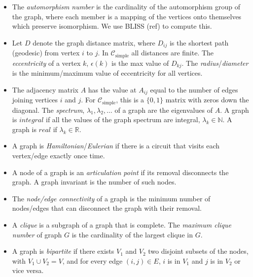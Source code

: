 \documentclass[12pt]{article}
\newcommand{\SIMPLECLASS}{\mathcal{C}_\text{simple}}
\begin{document}
\begin{itemize}
\item The \textit{automorphism number} is the cardinality of the automorphism group of the graph, where each member is a mapping of the vertices onto themselves which preserve isomorphism. We use BLISS (ref) to compute this.

\item Let $D$ denote the graph distance matrix, where $D_{ij}$ is the shortest path (geodesic) from vertex $i$ to $j$. In $\SIMPLECLASS$ all distances are finite. The \textit{eccentricity} of a vertex $k$, $\epsilon(k)$ is the max value of $D_{k j}$. The \textit{radius}/\textit{diameter} is the minimum/maximum value of eccentricity for all vertices.

\item The adjacency matrix $A$ has the value at $A_{ij}$ equal to the number of edges joining vertices $i$ and $j$. For $\SIMPLECLASS$, this is a $\{0,1\}$ matrix with zeros down the diagonal. The \textit{spectrum}, $\lambda_1, \lambda_2, \ldots$ of a graph are the eigenvalues of $A$. A graph is $integral$ if all the values of the graph spectrum are integral, $\lambda_k \in \mathbb{N}$. A graph is $real$ if $\lambda_k \in \mathbb{R}$.

\item A graph is \textit{Hamiltonian}/\textit{Eulerian} if there is a circuit that visits each vertex/edge exactly once time.



\item A node of a graph is an \textit{articulation point} if its removal disconnects the graph. A graph invariant is the number of such nodes. 

\item The \textit{node/edge connectivity} of a graph is the minimum number of nodes/edges that can disconnect the graph with their removal. 

\item A \textit{clique} is a subgraph of a graph that is complete. The \textit{maximum clique number} of graph $G$ is the cardinality of the largest clique in $G$. 

\item A graph is \textit{bipartite} if there exists $V_1$ and $V_2$ two disjoint subsets of the nodes, with $V_1 \cup V_2 = V$, and for every edge $(i,j) \in E$,  $i$ is in $V_1$ and $j$ is in $V_2$ or vice versa.


\end{itemize}
\end{document}

